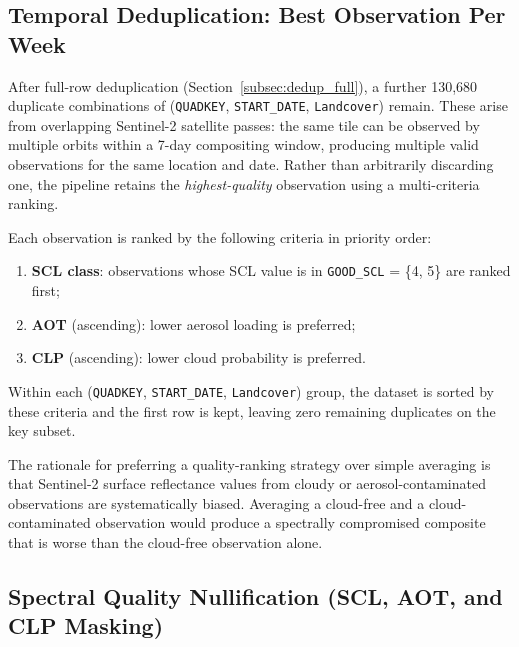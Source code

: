 \subsection{Temporal Deduplication: Best Observation Per Week}
\label{subsec:temporal_dedup}

After full-row deduplication (Section~\ref{subsec:dedup_full}), a further
130,680 duplicate combinations of (\texttt{QUADKEY}, \texttt{START\_DATE},
\texttt{Landcover}) remain. These arise from overlapping Sentinel-2
satellite passes: the same tile can be observed by multiple orbits within
a 7-day compositing window, producing multiple valid observations for the
same location and date. Rather than arbitrarily discarding one, the
pipeline retains the \emph{highest-quality} observation using a
multi-criteria ranking.

Each observation is ranked by the following criteria in priority order:
\begin{enumerate}
    \item \textbf{SCL class}: observations whose SCL value is in
          \texttt{GOOD\_SCL} = \{4, 5\} are ranked first;
    \item \textbf{AOT} (ascending): lower aerosol loading is preferred;
    \item \textbf{CLP} (ascending): lower cloud probability is preferred.
\end{enumerate}
Within each (\texttt{QUADKEY}, \texttt{START\_DATE}, \texttt{Landcover})
group, the dataset is sorted by these criteria and the first row is kept,
leaving zero remaining duplicates on the key subset.

The rationale for preferring a quality-ranking strategy over simple
averaging is that Sentinel-2 surface reflectance values from cloudy or
aerosol-contaminated observations are systematically biased. Averaging
a cloud-free and a cloud-contaminated observation would produce a
spectrally compromised composite that is worse than the cloud-free
observation alone.


\subsection{Spectral Quality Nullification (SCL, AOT, and CLP Masking)}
\label{subsec:nullification}

